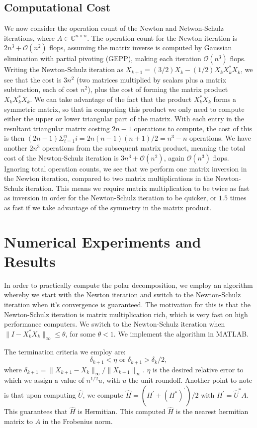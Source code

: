 \documentclass[12pt]{article}
\def\C{\mathbb{C}}
\def\nbyn{n \times n}
\def\normo#1{\|#1\|_{\infty}}
\begin{document}
\subsection{Computational Cost}
We now consider the operation count of the Newton and Netwon-Schulz iterations,
where $A \in \C^{\nbyn}$. The operation count for the Newton iteration is
$2n^3 + \mathcal{O}(n^2)$ flops, assuming the matrix inverse is computed by Gaussian
elimination with partial pivoting (GEPP), making each iteration
$\mathcal{O}(n^3)$ flops. Writing the Newton-Schulz iteration as
$X_{k+1} = (3/2)X_k - (1/2)X_kX_k^*X_k$, we see that the cost is $3n^2$ (two
matrices multiplied by scalars plus a matrix subtraction, each of cost $n^2$),
plus the cost of forming the matrix product $X_kX_k^*X_k$. We can take
advantage of the fact that the product $X_k^*X_k$ forms a symmetric matrix, so
that in computing this product we only need to compute either the upper or lower
triangular part of the matrix. With each entry in the resultant triangular
matrix costing $2n-1$ operations to compute, the cost of this is then
$(2n-1)\Sigma_{i=1}^n i = 2n(n-1)(n+1)/2 = n^3 - n$ operations. We have another
$2n^3$ operations from the subsequent matrix product, meaning the total cost of
the Newton-Schulz iteration is $3n^3 + \mathcal{O}(n^2)$, again
$\mathcal{O}(n^3)$ flops. Ignoring total operation counts, we see that we perform one
matrix inversion in the Newton iteration, compared to two matrix multiplications
in the Newton-Schulz iteration. This means we require matrix multiplication to
be twice as fast as inversion in order for the Newton-Schulz iteration to be
quicker, or $1.5$ times as fast if we take advantage of the symmetry in the
matrix product.

\section{Numerical Experiments and Results}
In order to practically compute the polar decomposition, we employ an algorithm
whereby we start with the Newton iteration and switch to the Newton-Schulz
iteration when it's convergence is guaranteed. The motivation for this is that
the Newton-Schulz iteration is matrix multiplication rich,
which is very fast on high performance computers.
We switch to the Newton-Schulz iteration when
$\normo{I - X_k^*X_k} \leq \theta$, for some $\theta < 1$.
We implement the algorithm in MATLAB.

The termination criteria we employ are:
\begin{equation*}
  \delta_{k+1} < \eta \text{ or } \delta_{k+1} > \delta_k /2\text{, }
\end{equation*}
where $\delta_{k+1} = \normo{X_{k+1} - X_k}/\normo{X_{k+1}}$. $\eta$ is the
desired relative error to which we assign a value of $n^{1/2}u$, with $u$ the
unit roundoff. Another point to note is that upon computing $\hat{U}$, we
compute $\hat{H} = (H^{\prime} + (H^*)^{\prime})/2$ with
$H^{\prime} = \hat{U}^*A$. This guarantees that $\hat{H}$ is Hermitian.
This computed $\hat{H}$ is the nearest hermitian matrix to $A$ in the Frobenius norm.
\end{document}
